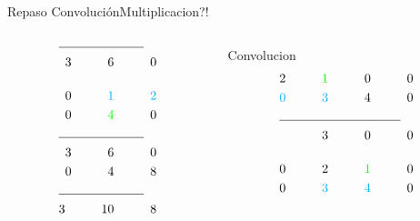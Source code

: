 \begin{frame}{Repaso Convolución}{Multiplicacion?!}
\begin{columns}[t]
\begin{column}{.3\textwidth}
\begin{align*}
               \cline{1-2}
               3\hspace{1cm} 6 \hspace{1cm}0\\[0.4cm]
               0\hspace{1cm}\textcolor{cyan} {1} \hspace{1cm}\textcolor{cyan}{2}\\
               0\hspace{1cm}\textcolor{green}{4} \hspace{1cm}                 0\\
               \cline{1-2}
               3\hspace{1cm} 6 \hspace{1cm}0\\
               0\hspace{1cm} 4 \hspace{1cm}8\\
               \cline{1-2}
               3 \hspace{1cm}10 \hspace{1cm} 8\\
            \end{align*}
      \end{column}
      \hspace{2pt}
      \vrule
      \hspace{2pt}
      \begin{column}{.3\textwidth}
      \tiny
      Convolucion
            \begin{align*}
                                2 \hspace{1cm} \textcolor{green}{1}\hspace{1cm}0 \hspace{1cm}0\\
               \textcolor{cyan}{0}\hspace{1cm} \textcolor{cyan} {3}\hspace{1cm}4 \hspace{1cm}0\\
               \cline{1-2}
               3\hspace{1cm} 0\hspace{1cm}0\\[0.4cm]
               0\hspace{1cm}                  2 \hspace{1cm}\textcolor{green}{1} \hspace{1cm}0\\
               0\hspace{1cm} \textcolor{cyan}{3}\hspace{1cm}\textcolor{cyan} {4} \hspace{1cm}0\\

\end{align*}
\end{column}
\end{columns}
\end{frame}
